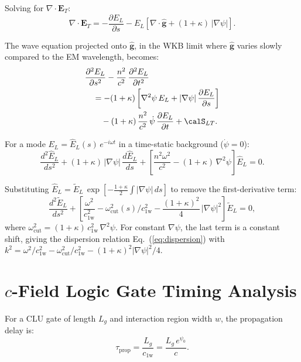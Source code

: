 \documentclass[aps,prd,twocolumn,superscriptaddress,nofootinbib,floatfix]{revtex4-2}
\newcommand{\psifield}{\psi}
\newcommand{\cfield}{c_{\text{1w}}}
\newcommand{\cvac}{c}
\newcommand{\Evec}{\mathbf{E}}
\begin{document}
Solving for $\nabla\cdot\Evec_T$:
\begin{equation}
\nabla\cdot\Evec_T = -\frac{\partial E_L}{\partial s}
- E_L\!\left[\nabla\cdot\hat{\mathbf{g}}
+ (1+\kappa)\,|\nabla\psifield|\right].
\label{eq:app_div_ET}
\end{equation}

The wave equation projected onto $\hat{\mathbf{g}}$, in the WKB
limit where $\hat{\mathbf{g}}$ varies slowly compared to the EM
wavelength, becomes:
\begin{align}
&\frac{\partial^2 E_L}{\partial s^2}
- \frac{n^2}{\cvac^2}\,\frac{\partial^2 E_L}{\partial t^2}
\nonumber\\
&\quad = -(1+\kappa)\left[\nabla^2\psifield\,E_L
+ |\nabla\psifield|\,\frac{\partial E_L}{\partial s}\right]
\nonumber\\
&\qquad - (1+\kappa)\,\frac{n^2}{\cvac^2}\,
\dot\psifield\,\frac{\partial E_L}{\partial t} + \calS_{LT}.
\label{eq:app_full_wave}
\end{align}

For a mode $E_L = \hat{E}_L(s)\,e^{-i\omega t}$ in a time-static
background ($\dot\psifield = 0$):
\begin{equation}
\frac{d^2\hat{E}_L}{ds^2}
+ (1+\kappa)\,|\nabla\psifield|\,\frac{d\hat{E}_L}{ds}
+ \left[\frac{n^2\omega^2}{\cvac^2}
- (1+\kappa)\,\nabla^2\psifield\right]\hat{E}_L = 0.
\label{eq:app_helmholtz}
\end{equation}

Substituting $\hat{E}_L = \tilde{E}_L\,\exp\!\left[
-\tfrac{1+\kappa}{2}\int|\nabla\psifield|\,ds\right]$
to remove the first-derivative term:
\begin{equation}
\frac{d^2\tilde{E}_L}{ds^2}
+ \left[\frac{\omega^2}{\cfield^2}
- \omega_{\text{cut}}^2(s)/\cfield^2
- \frac{(1+\kappa)^2}{4}\,|\nabla\psifield|^2\right]
\tilde{E}_L = 0,
\label{eq:app_reduced}
\end{equation}
where $\omega_{\text{cut}}^2 = (1+\kappa)\,\cfield^2\,
\nabla^2\psifield$. For constant $\nabla\psifield$, the
last term is a constant shift, giving the dispersion relation
Eq.~(\ref{eq:dispersion}) with
$k^2 = \omega^2/\cfield^2 - \omega_{\text{cut}}^2/\cfield^2
- (1+\kappa)^2|\nabla\psifield|^2/4$.

\section{$c$-Field Logic Gate Timing Analysis}
\label{app:timing}

For a CLU gate of length $L_g$ and interaction region width $w$,
the propagation delay is:
\begin{equation}
\tau_{\text{prop}} = \frac{L_g}{\cfield}
= \frac{L_g\,e^{\psifield_0}}{\cvac}.
\label{eq:prop_delay}
\end{equation}
\end{document}
